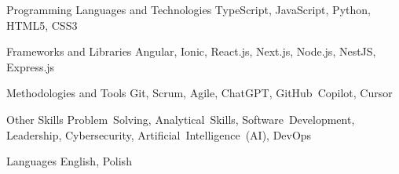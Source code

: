 
\begin{cvskills}

  \cvskill
    {Programming Languages and Technologies} %
    {TypeScript, JavaScript, Python, HTML5, CSS3} %

  \cvskill
    {Frameworks and Libraries} %
    {Angular, Ionic, React.js, Next.js, Node.js, NestJS, Express.js} %

  \cvskill
    {Methodologies and Tools} %
    {Git, Scrum, Agile, ChatGPT, GitHub~Copilot, Cursor} %

  \cvskill
    {Other Skills} %
    {Problem~Solving, Analytical~Skills, Software~Development, Leadership, Cybersecurity, Artificial~Intelligence~(AI), DevOps} %

  \cvskill
    {Languages} %
    {English, Polish} %

\end{cvskills}
